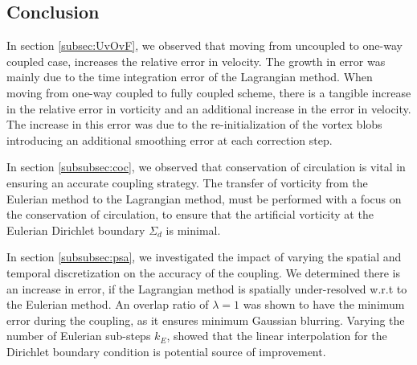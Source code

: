
%

\subsection{Conclusion}

In section \ref{subsec:UvOvF}, we observed that moving from uncoupled to one-way coupled case, increases the relative error in velocity. The growth in error was mainly due to the time integration error of the Lagrangian method. When moving from one-way coupled to fully coupled scheme, there is a tangible increase in the relative error in vorticity and an additional increase in the error in velocity. The increase in this error was due to the re-initialization of the vortex blobs introducing an additional smoothing error at each correction step. 

In section \ref{subsubsec:coc}, we observed that conservation of circulation is vital in ensuring an accurate coupling strategy. The transfer of vorticity from the Eulerian method to the Lagrangian method, must be performed with a focus on the conservation of circulation, to ensure that the artificial vorticity at the Eulerian Dirichlet boundary $\Sigma_d$ is minimal.

In section \ref{subsubsec:psa}, we investigated the impact of varying the spatial and temporal discretization on the accuracy of the coupling. We determined there is an increase in error, if the Lagrangian method is spatially under-resolved w.r.t to the Eulerian method. An overlap ratio of $\lambda=1$ was shown to have the minimum error during the coupling, as it ensures minimum Gaussian blurring. Varying the number of Eulerian sub-steps $k_E$, showed that the linear interpolation for the Dirichlet boundary condition is potential source of improvement.

